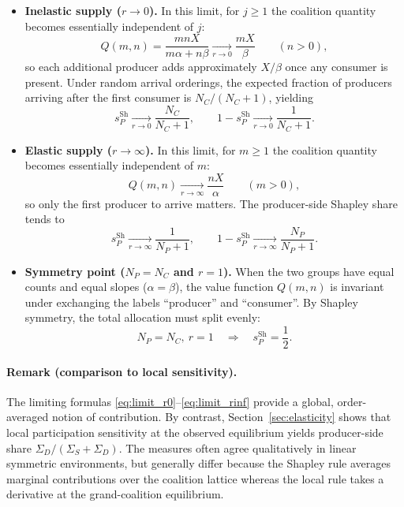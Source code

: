 \documentclass[journal, a4paper]{IEEEtran}
\begin{document}
\begin{itemize}
\item \textbf{Inelastic supply ($r\to 0$).} In this limit, for $j\ge 1$ the coalition quantity becomes essentially independent of $j$:
\begin{equation}
Q(m,n)=\frac{mnX}{m\alpha+n\beta}\xrightarrow[r\to 0]{}\frac{mX}{\beta}\qquad (n>0),
\end{equation}
so each additional producer adds approximately $X/\beta$ once any consumer is present. Under random arrival orderings, the expected fraction of producers arriving after the first consumer is $N_C/(N_C+1)$, yielding
\begin{equation}
s_P^{\mathrm{Sh}} \xrightarrow[r\to 0]{} \frac{N_C}{N_C+1},
\qquad
1-s_P^{\mathrm{Sh}} \xrightarrow[r\to 0]{} \frac{1}{N_C+1}.
\label{eq:limit_r0}
\end{equation}

\item \textbf{Elastic supply ($r\to \infty$).} In this limit, for $m\ge 1$ the coalition quantity becomes essentially independent of $m$:
\begin{equation}
Q(m,n)\xrightarrow[r\to \infty]{}\frac{nX}{\alpha}\qquad (m>0),
\end{equation}
so only the first producer to arrive matters. The producer-side Shapley share tends to
\begin{equation}
s_P^{\mathrm{Sh}} \xrightarrow[r\to \infty]{} \frac{1}{N_P+1},
\qquad
1-s_P^{\mathrm{Sh}} \xrightarrow[r\to \infty]{} \frac{N_P}{N_P+1}.
\label{eq:limit_rinf}
\end{equation}

\item \textbf{Symmetry point ($N_P=N_C$ and $r=1$).} When the two groups have equal counts and equal slopes ($\alpha=\beta$), the value function $Q(m,n)$ is invariant under exchanging the labels ``producer'' and ``consumer''. By Shapley symmetry, the total allocation must split evenly:
\begin{equation}
N_P=N_C,\ r=1
\quad\Rightarrow\quad
s_P^{\mathrm{Sh}}=\frac{1}{2}.
\label{eq:symmetry_half}
\end{equation}
\end{itemize}

\paragraph{Remark (comparison to local sensitivity).}
The limiting formulas \eqref{eq:limit_r0}--\eqref{eq:limit_rinf} provide a global, order-averaged notion of contribution. By contrast, Section~\ref{sec:elasticity} shows that local participation sensitivity at the observed equilibrium yields producer-side share $\Sigma_D/(\Sigma_S+\Sigma_D)$. The measures often agree qualitatively in linear symmetric environments, but generally differ because the Shapley rule averages marginal contributions over the coalition lattice whereas the local rule takes a derivative at the grand-coalition equilibrium.
\end{document}
